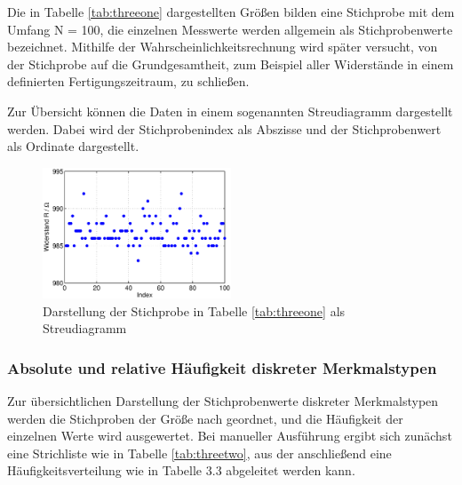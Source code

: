 \noindent Die in Tabelle \ref{tab:threeone} dargestellten Gr\"{o}{\ss}en bilden eine Stichprobe mit dem Umfang N = 100, die einzelnen Messwerte werden allgemein als Stichprobenwerte bezeichnet. Mithilfe der Wahrscheinlichkeitsrechnung wird sp\"{a}ter versucht, von der Stichprobe auf die Grundgesamtheit, zum Beispiel aller Widerst\"{a}nde in einem definierten Fertigungszeitraum, zu schlie{\ss}en. \newline

\noindent Zur \"{U}bersicht k\"{o}nnen die Daten in einem sogenannten Streudiagramm dargestellt werden. Dabei wird der Stichprobenindex als Abszisse und der Stichprobenwert als Ordinate dargestellt. 

\noindent 
\begin{figure}[H]
  \centerline{\includegraphics[width=0.5\textwidth]{Kapitel3/Bilder/image1}}
  \caption{Darstellung der Stichprobe in Tabelle \ref{tab:threeone} als Streudiagramm}
  \label{fig:RelHaeufigkeitUndSummenhStichprobeWiderstand1}
\end{figure}

\subsubsection{Absolute und relative H\"{a}ufigkeit diskreter Merkmalstypen}\label{threetwoone}

\noindent Zur \"{u}bersichtlichen Darstellung der Stichprobenwerte diskreter Merkmalstypen werden die Stichproben der Gr\"{o}{\ss}e nach geordnet, und die H\"{a}ufigkeit der einzelnen Werte wird ausgewertet. Bei manueller Ausf\"{u}hrung ergibt sich zun\"{a}chst eine Strichliste wie in Tabelle \ref{tab:threetwo}, aus der anschlie{\ss}end eine H\"{a}ufigkeitsverteilung wie in Tabelle 3.3 abgeleitet werden kann.


